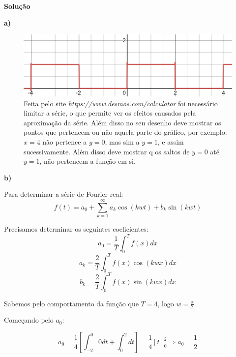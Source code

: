 \linespread{1.5}
\textbf{Solução}

\textbf{a)}
\begin{figure}[H]
    \centering
    \includegraphics[width = 0.7\linewidth]{fig/sf13.png}
    \caption{Feita pelo site \textit{https://www.desmos.com/calculator} foi necessário limitar a série, o que permite ver os efeitos causados pela aproximação da série. Além disso no seu desenho deve mostrar os pontos que pertencem ou não aquela parte do gráfico, por exemplo: $x=4$ não pertence a $y=0$, mas sim a $y=1$, e assim sucessivamente. Além disso deve mostrar q os saltos de $y=0$ até $y=1$, não pertencem a função em si.
    }
\end{figure}

\textbf{b)}

Para determinar a série de Fourier real:
\begin{equation}
    \label{eq:Fourierserie}
    f(t) = a_0 + \sum_{k=1}^\infty a_k\cos{(kwt)} + b_k\sin{(kwt)}
\end{equation}

Precisamos determinar os seguintes coeficientes:
\begin{equation}
    \label{eq:a0Fourier}
    a_0 = \frac{1}{T}\int_0^T f(x)dx
\end{equation}
\begin{equation}
    \label{eq:akFourier}
    a_k = \frac{2}{T}\int_0^T f(x)\cos{(kwx)}dx
\end{equation}
\begin{equation}
    \label{eq:bkFourier}
    b_k = \frac{2}{T}\int_0^T f(x)\sin{(kwx)}dx
\end{equation}

Sabemos pelo comportamento da função que $T=4$, logo $w=\frac{\pi}{2}$.

Começando pelo $a_0$:

\begin{equation*}
    a_0 = \frac{1}{4}\left[\int_{-2}^0 0dt + \int^2_0 dt \right] = \frac{1}{4} \left[t\right]^2_0 \Rightarrow \boxed{a_0 = \frac{1}{2}}
\end{equation*}

